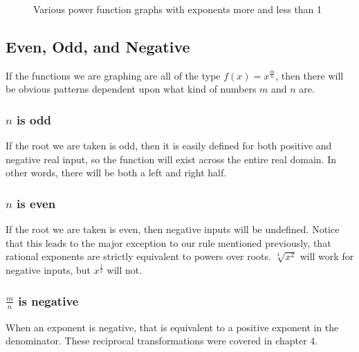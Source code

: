 \begin{figure}
\begin{centering}
\caption{Various power function graphs with exponents more and less than 1}
\end{centering}
\end{figure}

\subsection{Even, Odd, and Negative}
If the functions we are graphing are all of the type $f(x)=x^\frac{m}{n}$, then there will be
obvious patterns dependent upon what kind of numbers $m$ and $n$ are.  

\subsubsection{$n$ is odd}
If the root we are taken is odd, then it is easily defined for both positive and negative real input,
so the function will exist across the entire real domain.  In other words, there will be both a
left and right half.

\subsubsection{$n$ is even}
If the root we are taken is even, then negative inputs will be undefined.  Notice that this leads to
the major exception to our rule mentioned previously, that rational exponents are strictly equivalent
to powers over roots.  $\sqrt[4]{x^2}$ will work for negative inputs, but $x^\frac{1}{2}$ will not.

\subsubsection{$\frac{m}{n}$ is negative}
When an exponent is negative, that is equivalent to a positive exponent in the denominator.
These reciprocal transformations were covered in chapter 4.
